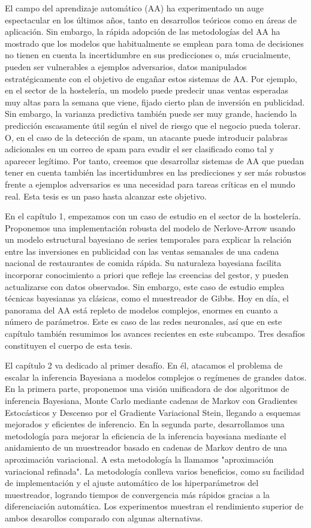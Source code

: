 \documentclass[a4paper, 11pt, openright, twoside]{reportPhD}
\numberwithin{figure}{chapter}
\numberwithin{table}{chapter}
\numberwithin{equation}{chapter}
\begin{document}
El campo del aprendizaje automático (AA) ha experimentado un auge espectacular en los últimos años, tanto en desarrollos teóricos como en áreas de aplicación. Sin embargo, la rápida adopción  de las metodologías del AA ha mostrado que los modelos que habitualmente se emplean para toma de decisiones no tienen en cuenta la incertidumbre en sus predicciones o, más crucialmente, pueden ser vulnerables a ejemplos adversarios, datos manipulados estratégicamente con el objetivo de engañar estos sistemas de AA. Por ejemplo, en el sector de la hostelería, un modelo puede predecir unas ventas esperadas muy altas para la semana que viene, fijado cierto plan de inversión en publicidad. Sin embargo, la varianza predictiva también puede ser muy grande, haciendo la predicción escasamente útil según el nivel de riesgo que el negocio pueda tolerar. O, en el caso de la detección de spam, un atacante puede introducir palabras adicionales en un correo de spam  para evadir el ser clasificado como tal y aparecer  legítimo.
Por tanto, creemos que desarrollar sistemas de AA que puedan tener en cuenta también las incertidumbres en las predicciones y ser más robustos frente a ejemplos adversarios es una necesidad para tareas críticas en el mundo real. Esta tesis es un paso hasta alcanzar este objetivo.

En el capítulo 1, empezamos con un caso de estudio en el sector de la hostelería. Proponemos una implementación robusta del modelo de Nerlove-Arrow usando un modelo  estructural bayesiano de series temporales para explicar la relación entre las inversiones en publicidad con las ventas semanales de una cadena nacional de restaurantes de comida rápida. Su naturaleza bayesiana facilita  incorporar conocimiento a priori que refleje las creencias del gestor, y pueden  actualizarse con datos observados. Sin embargo, este caso de estudio emplea técnicas bayesianas ya clásicas, como el muestreador de Gibbs. Hoy en día, el panorama del AA está repleto de modelos complejos, enormes en cuanto a número de parámetros. Este es caso de las redes neuronales, así que en este capítulo también resumimos los avances recientes en este subcampo. Tres desafíos constituyen el cuerpo de esta tesis.

El capítulo 2 va dedicado al primer desafío. En él, atacamos el problema de escalar la inferencia Bayesiana a modelos complejos o regímenes de grandes datos. En la primera parte, proponemos una visión unificadora de dos algoritmos de inferencia Bayesiana, Monte Carlo mediante cadenas de Markov con Gradientes Estocásticos y Descenso por el Gradiente Variacional Stein, llegando a  esquemas mejorados y eficientes de inferencio. En la segunda parte, desarrollamos una metodología para mejorar la eficiencia de la inferencia bayesiana mediante el anidamiento de un muestreador basado en cadenas de Markov dentro de una aproximación variacional. A esta metodología la llamamos "aproximación variacional refinada". La metodología conlleva varios beneficios, como su facilidad de implementación y el ajuste automático de los hiperparámetros del muestreador, logrando tiempos de convergencia más rápidos gracias a la diferenciación automática. Los experimentos muestran el rendimiento superior de ambos desarollos comparado con algunas alternativas.
\end{document}
